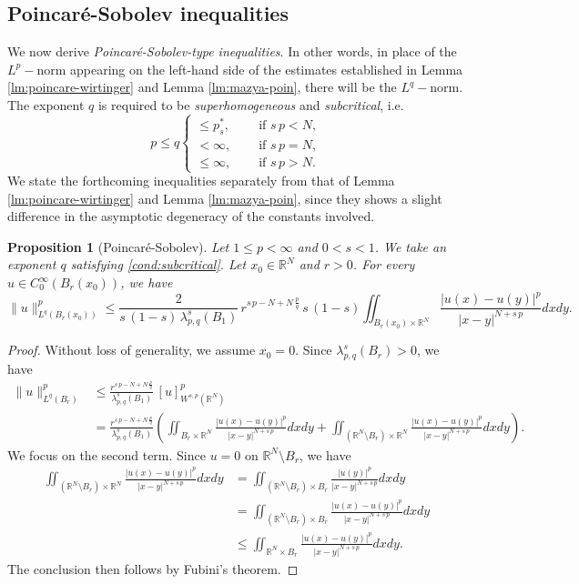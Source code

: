 \documentclass{amsart}
\newtheorem{proposition}[theorem]{Proposition}
\theoremstyle{definition}
\numberwithin{equation}{section}
\begin{document}
\subsection{Poincar\'e-Sobolev inequalities}
We now derive {\it Poincar\'e-Sobolev-type inequalities}. In other words, in place of the $L^p-$norm appearing on the left-hand side of the estimates established in Lemma \ref{lm:poincare-wirtinger} and Lemma \ref{lm:mazya-poin}, there will be the $L^q-$norm. The exponent $q$ is required to be {\it superhomogeneous} and {\it subcritical}, i.e.   
\begin{equation} \label{cond:subcritical}
	p\le q \begin{cases}
		\le p^*_s, \quad &\mbox{ if } s\,p<N,\\
		<\infty, \quad &\mbox{ if } s\,p=N,\\
		\le\infty, \quad &\mbox{ if } s\,p>N. 
	\end{cases}
\end{equation}
We state the forthcoming inequalities separately from that of Lemma \ref{lm:poincare-wirtinger} and Lemma \ref{lm:mazya-poin}, since they shows a slight difference in the asymptotic degeneracy of the constants involved.   

\begin{proposition}[Poincar\'e-Sobolev] \label{prop:poin-sobolev}
	Let $1\le p<\infty$ and $0<s<1$. We take an exponent $q$ satisfying \eqref{cond:subcritical}.  
	Let $x_0 \in \mathbb{R}^N$ and $r > 0$. For every $u\in C^\infty_0(B_r(x_0))$, we have
	\[
	\|u\|^p_{L^q(B_r(x_0))}\le \frac{2}{s\,(1-s)\,\lambda_{p,q}^s(B_1)}\,r^{s\,p-N + N\,\frac{p}{q}}\,s\,(1-s)\iint_{B_r(x_0) \times \mathbb{R}^N}\frac{|u(x) - u(y)|^{p}}{|x-y|^{N+s\,p}}dxdy. 
	\]
\end{proposition}
\begin{proof}
	Without loss of generality, we assume $x_0=0$. Since $\lambda^s_{p,q}(B_r) > 0$, we have
	\[
	\begin{split}
		\|u\|^p_{L^q(B_r)}&\le \frac{r^{s\,p -N + N\,\frac{p}{q}} }{\lambda_{p,q}^s(B_1)}\,[u]^p_{W^{s,p}(\mathbb{R}^N)} \\
		&= \frac{r^{s\,p - N + N\,\frac{p}{q}} }{\lambda_{p,q}^s(B_1)} \left(\iint_{B_r \times \mathbb{R}^N}\frac{|u(x) - u(y)|^p}{|x-y|^{N+s\,p}}dxdy + \iint_{\left(\mathbb{R}^N \setminus B_r \right) \times \mathbb{R}^N}\frac{|u(x) - u(y)|^p}{|x-y|^{N+s\,p}}dxdy\right).
	\end{split}
	\]
	We focus on the second term. Since $u = 0$ on $\mathbb{R}^N \setminus B_r$, we have 
	\[
	\begin{split}
		\iint_{\left(\mathbb{R}^N \setminus B_r \right) \times \mathbb{R}^N}\frac{|u(x) - u(y)|^p}{|x-y|^{N+s\,p}}dxdy &= \iint_{\left(\mathbb{R}^N \setminus B_r\right) \times B_r } \frac{|u(y)|^p}{|x-y|^{N+s\,p}}dxdy \\
		&= \iint_{\left(\mathbb{R}^N \setminus B_r\right) \times B_r } \frac{|u(x) - u(y)|^p}{|x-y|^{N+s\,p}}dxdy \\
		&\le  \iint_{\mathbb{R}^N \times B_r } \frac{|u(x) - u(y)|^p}{|x-y|^{N+s\,p}}dxdy. 
	\end{split}
	\]
	The conclusion then follows by Fubini's theorem.
\end{proof}
\end{document}
